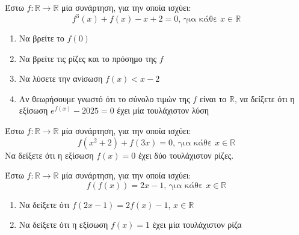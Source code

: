 \documentclass{presentation}
\begin{document}
\begin{askisi}
  Έστω $f:\mathbb{R}\to\mathbb{R}$ μία συνάρτηση, για την οποία ισχύει:
  $$f^3(x)+f(x)-x+2=0\text{, για κάθε } x\in\mathbb{R}$$
  \begin{enumerate}
    \item<1-> Να βρείτε το $f(0)$
    \item<2-> Να βρείτε τις ρίζες και το πρόσημο της $f$
    \item<3-> Να λύσετε την ανίσωση $f(x)<x-2$
    \item<4-> Αν θεωρήσουμε γνωστό ότι το σύνολο τιμών της $f$ είναι το $\mathbb{R}$, να δείξετε ότι η εξίσωση $e^{f(x)}-2025=0$ έχει μία τουλάχιστον λύση
  \end{enumerate}

\end{askisi}

\begin{askisi}
  Έστω $f:\mathbb{R}\to\mathbb{R}$ μία συνάρτηση, για την οποία ισχύει:
  $$f(x^2+2)+f(3x)=0 \text{, για κάθε } x\in\mathbb{R}$$
  Να δείξετε ότι η εξίσωση $f(x)=0$ έχει δύο τουλάχιστον ρίζες.

\end{askisi}

\begin{askisi}
  Έστω $f:\mathbb{R}\to\mathbb{R}$ μία συνάρτηση, για την οποία ισχύει:
  $$f\left(f(x)\right)=2x-1\text{, για κάθε } x\in\mathbb{R}$$
  \begin{enumerate}
    \item<1-> Να δείξετε ότι $f(2x-1)=2f(x)-1$, $x\in\mathbb{R}$
    \item<2-> Να δείξετε ότι η εξίσωση $f(x)=1$ έχει μία τουλάχιστον ρίζα
  \end{enumerate}

\end{askisi}

\moodle
\end{document}
